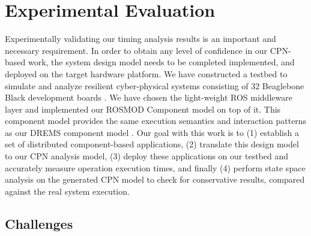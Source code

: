 \chapter{Experimental Evaluation}
\label{chapter:evaluation}

Experimentally validating our timing analysis results is an important and necessary requirement. In order to obtain any level of confidence in our CPN-based work, the system design model needs to be completed implemented, and deployed on the target hardware platform. We have constructed a testbed \cite{kumarTestbed} to simulate and analyze resilient cyber-physical systems consisting of 32 Beaglebone Black development boards \cite{BBB}. We have chosen the light-weight ROS \cite{ROS} middleware layer and implemented our ROSMOD Component model \cite{kumarROSMOD} on top of it. This component model provides the same execution semantics and interaction patterns as our DREMS component model \cite{ISIS_F6_ISORC:13}. Our goal with this work is to (1) establish a set of distributed component-based applications, (2) translate this design model to our CPN analysis model, (3) deploy these applications on our testbed and accurately measure operation execution times, and finally (4) perform state space analysis on the generated CPN model to check for conservative results, compared against the real system execution.

\section{Challenges}

